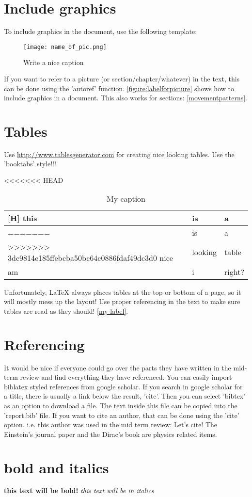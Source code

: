 \section{Include graphics}
To include graphics in the document, use the following template:

\begin{figure}[H]
\centering
\texttt{[image: name\_of\_pic.png]}
\captionsetup{justification=centering}
\caption{Write a nice caption}
\label{figure:labelforpicture}
\end{figure}

If you want to refer to a picture (or section/chapter/whatever) in the text, this can be done using the 'autoref' function. \autoref{figure:labelforpicture} shows how to include graphics in a document. This also works for sections: \autoref{movementpatterns}.

\section{Tables}
Use \url{http://www.tablesgenerator.com} for creating nice looking tables. Use the 'booktabs' style!!!
\begin{table}[H]
\centering
\caption{My caption}
\label{my-label}
<<<<<<< HEAD
\begin{tabular}{lll}[H]
\hline
this & is      & a      \\ \hline
=======
\begin{tabular}{@{}lll@{}}
\toprule
this & is      & a      \\ \midrule
>>>>>>> 3dc9814e185ffebcba50bc64c0886fdaf49dc3d0
nice & looking & table  \\
am   & i       & right? \\ \bottomrule
\end{tabular}
\end{table}
Unfortunately, LaTeX always places tables at the top or bottom of a page, so it will mostly mess up the layout! Use proper referencing in the text to make sure tables are read as they should! \autoref{my-label}.

\section{Referencing}
It would be nice if everyone could go over the parts they have written in the mid-term review and find everything they have referenced. You can easily import biblatex styled references from google scholar. If you search in google scholar for a title, there is usually a link below the result, 'cite'. Then you can select 'bibtex' as an option to download a file. The text inside this file can be copied into the 'report.bib' file. If you want to cite an author, that can be done using the 'cite' option. i.e. this author was used in the mid term review:
Let's cite! The Einstein's journal paper \cite{mautz2012indoor} and the Dirac's 
book \cite{meneses2012large} are physics related items. 

\section{bold and italics}
\textbf{this text will be bold!}
\textit{this text will be in italics}




